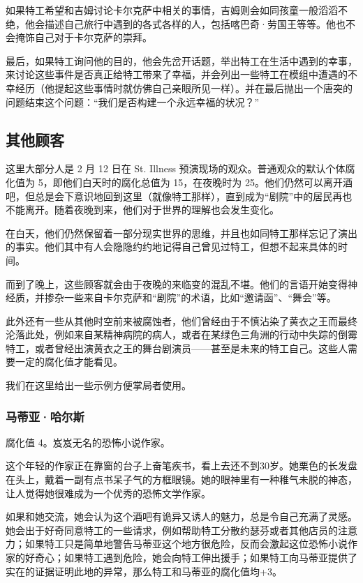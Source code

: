 如果特工希望和吉姆讨论卡尔克萨中相关的事情，吉姆则会如同孩童一般滔滔不绝，他会描述自己旅行中遇到的各式各样的人，包括喀巴奇·劳国王等等。他也不会掩饰自己对于卡尔克萨的崇拜。

最后，如果特工询问他的目的，他会先岔开话题，举出特工在生活中遇到的幸事，来讨论这些事件是否真正给特工带来了幸福，并会列出一些特工在模组中遭遇的不幸经历（他提起这些事情时就仿佛自己亲眼所见一样）。并在最后抛出一个唐突的问题结束这个问题：“我们是否构建一个永远幸福的状况？”

\subsection{其他顾客}
这里大部分人是 2 月 12 日在 St. Illness 预演现场的观众。普通观众的默认个体腐化值为 5，即他们白天时的腐化总值为 15，在夜晚时为 25。他们仍然可以离开酒吧，但总是会下意识地回到这里（就像特工那样），直到成为“剧院”中的居民再也不能离开。随着夜晚到来，他们对于世界的理解也会发生变化。

在白天，他们仍然保留着一部分现实世界的思维，并且也如同特工那样忘记了演出的事实。他们其中有人会隐隐约约地记得自己曾见过特工，但想不起来具体的时间。

而到了晚上，这些顾客就会由于夜晚的来临变的混乱不堪。他们的言语开始变得神经质，并掺杂一些来自卡尔克萨和“剧院”的术语，比如“邀请函”、“舞会”等。

此外还有一些从其他时空前来被腐蚀者，他们曾经由于不慎沾染了黄衣之王而最终沦落此处，例如来自某精神病院的病人，或者在某绿色三角洲的行动中失踪的倒霉特工，或者曾经出演黄衣之王的舞台剧演员——甚至是未来的特工自己。这些人需要一定的腐化值才能看见。

我们在这里给出一些示例方便掌局者使用。

\subsubsection{马蒂亚·哈尔斯}
腐化值 4。岌岌无名的恐怖小说作家。

这个年轻的作家正在靠窗的台子上奋笔疾书，看上去还不到30岁。她栗色的长发盘在头上，戴着一副有点书呆子气的方框眼镜。她的眼神里有一种稚气未脱的神态，让人觉得她很难成为一个优秀的恐怖文学作家。

如果和她交流，她会认为这个酒吧有诡异又诱人的魅力，总是令自己充满了灵感。她会出于好奇同意特工的一些请求，例如帮助特工分散约瑟芬或者其他店员的注意力；如果特工只是简单地警告马蒂亚这个地方很危险，反而会激起这位恐怖小说作家的好奇心；如果特工遇到危险，她会向特工伸出援手；如果特工向马蒂亚提供了实在的证据证明此地的异常，那么特工和马蒂亚的腐化值均+3。

